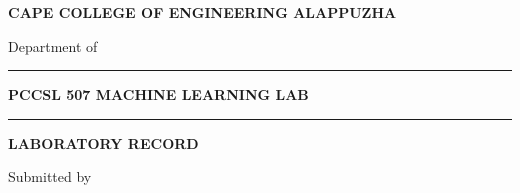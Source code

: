\documentclass[11pt]{article}
\begin{document}
\sloppy

\begin{center}
\vspace*{38pt}
{\fontsize{15}{18}\selectfont\textcolor{primary}{\textbf{CAPE COLLEGE OF ENGINEERING ALAPPUZHA}}}\par
\vspace{10pt}
{\fontsize{11}{14}\selectfont\textcolor{greytext}{Department of \underline{\hspace{4.5cm}}}}\par
\vspace{28pt}
{\color{primary}\rule{\textwidth}{0.75pt}}\par
\vspace{6pt}
{\fontsize{20}{24}\selectfont\textcolor{primary}{\textbf{PCCSL 507 MACHINE LEARNING LAB}}}\par
\vspace{6pt}
{\color{primary}\rule{\textwidth}{0.75pt}}\par
\vspace{10pt}
{\fontsize{15}{18}\selectfont\textbf{LABORATORY RECORD}}\par
\vspace{28pt}
{\fontsize{11}{14}\selectfont Submitted by}\par
\vspace{8pt}
\end{center}
\end{document}
